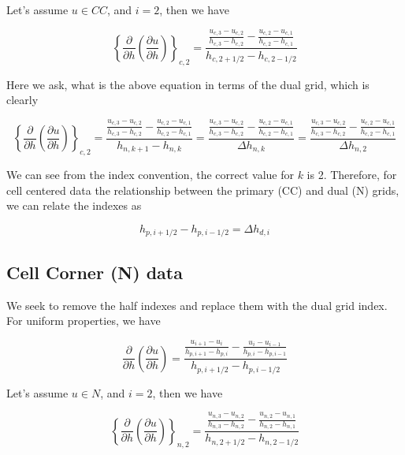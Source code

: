 \documentclass[11pt]{article}
\begin{document}
Let's assume $u\in CC$, and $i=2$, then we have

\begin{equation}
 \left\{\frac{\partial}{\partial h} \left( \frac{\partial u}{\partial h} \right) \right\}_{c,2}
 =
 \frac{
 \frac{u_{c,3}-u_{c,2}}{h_{c,3}-h_{c,2}} - 
 \frac{u_{c,2}-u_{c,1}}{h_{c,2}-h_{c,1}}
 }{h_{c,2+1/2} - h_{c,2-1/2}}
\end{equation}

Here we ask, what is the above equation in terms of the dual grid, which is clearly

\begin{equation}
 \left\{\frac{\partial}{\partial h} \left( \frac{\partial u}{\partial h} \right) \right\}_{c,2}
 = \frac{ \frac{u_{c,3}-u_{c,2}}{h_{c,3}-h_{c,2}} -  \frac{u_{c,2}-u_{c,1}}{h_{c,2}-h_{c,1}} }{h_{n,k+1} - h_{n,k}}
 =
 \frac{ \frac{u_{c,3}-u_{c,2}}{h_{c,3}-h_{c,2}} -  \frac{u_{c,2}-u_{c,1}}{h_{c,2}-h_{c,1}} }{\Delta h_{n,k}}
 =
 \frac{ \frac{u_{c,3}-u_{c,2}}{h_{c,3}-h_{c,2}} -  \frac{u_{c,2}-u_{c,1}}{h_{c,2}-h_{c,1}} }{\Delta h_{n,2}}
\end{equation}

We can see from the index convention, the correct value for $k$ is 2. Therefore, for cell centered data the relationship between the primary (CC) and dual (N) grids, we can relate the indexes as

\begin{equation}
  h_{p,i+1/2} - h_{p,i-1/2} = \Delta h_{d,i}
\end{equation}

\subsection{Cell Corner (N) data}
We seek to remove the half indexes and replace them with the dual grid index. For uniform properties, we have

\begin{equation}
\frac{\partial}{\partial h} \left( \frac{\partial u}{\partial h} \right)
 =
 \frac{\frac{u_{i+1}-u_{i}}{h_{p,i+1}-h_{p,i}} - \frac{u_{i}-u_{i-1}}{h_{p,i}-h_{p,i-1}}}{h_{p,i+1/2} - h_{p,i-1/2}}
\end{equation}

Let's assume $u\in N$, and $i=2$, then we have

\begin{equation}
 \left\{\frac{\partial}{\partial h} \left( \frac{\partial u}{\partial h} \right) \right\}_{n,2}
 =
 \frac{
 \frac{u_{n,3}-u_{n,2}}{h_{n,3}-h_{n,2}} - 
 \frac{u_{n,2}-u_{n,1}}{h_{n,2}-h_{n,1}}
 }{h_{n,2+1/2} - h_{n,2-1/2}}
\end{equation}
\end{document}
